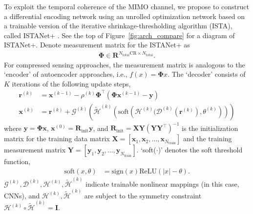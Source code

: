 To exploit the temporal coherence of the MIMO channel, we propose to construct a differential encoding network using an unrolled optimization network based on a trainable version of the iterative shrinkage-thresholding algorithm (ISTA), called ISTANet+ \cite{ref:zhang2018ista}. See the top of Figure~\ref{fig:arch_compare} for a diagram of ISTANet+. Denote measurement matrix for the ISTANet+ as 
\begin{align}
    \mathbf \Phi \in \mathbf{R}^{N_{\text{total}}\text{CR} \times N_{\text{total}}}.
\end{align}
For compressed sensing approaches, the measurement matrix is analogous to the `encoder' of autoencoder approaches, i.e., $f(x)=\mathbf\Phi x$. The `decoder' consists of $K$ iterations of the following update steps,
\begin{align}
    \mathbf{r}^{(k)} &= \mathbf{x}^{(k-1)}-\rho^{(k)}\mathbf{\Phi}^\top(\mathbf{\Phi}\mathbf x^{(k-1)}-\mathbf y) \label{eq:istanet-grad} \\
    \mathbf x^{(k)} &= \mathbf{r}^{(k)} + \mathcal{G}^{(k)}\left(\tilde{\mathcal{H}}^{(k)}\left(\text{soft}\left(\mathcal{H}^{(k)}(\mathcal{D}^{(k)}(\mathbf{r}^{(k)}), \theta^{(k)}\right)\right)\right) \label{eq:istanet-prox}
\end{align}
where $\mathbf y=\mathbf{\Phi} \mathbf x$, $\mathbf x^{(0)}=\mathbf{R}_{\text{init}}\mathbf{y}$, and $\mathbf R_{\text{init}}=\mathbf {XY}(\mathbf{YY}^\top)^{-1}$ is the initialization matrix for the training data matrix $\mathbf X = \left[\mathbf{x}_1, \mathbf{x}_2,\dots, \mathbf{x}_{N_{\text{train}}}\right]$ and the training measurement matrix $\mathbf Y = \left[\mathbf{y}_1, \mathbf{y}_2,\dots, \mathbf{y}_{N_{\text{train}}}\right]$. `soft($\cdot$)' denotes the soft threshold function,
\begin{align}
    \text{soft}(x, \theta) &= \text{sign}(x)\text{ReLU}(|x|-\theta). \label{eq:soft}
\end{align}
$\mathcal G^{(k)}, \mathcal D^{(k)},  \mathcal H^{(k)}, \tilde{\mathcal H}^{(k)}$ indicate trainable nonlinear mappings (in this case, CNNs), and $\mathcal H^{(k)}, \tilde{\mathcal H}^{(k)}$ are subject to the symmetry constraint $\mathcal H^{(k)}\circ \tilde{\mathcal H}^{(k)}=\mathbf I$.

